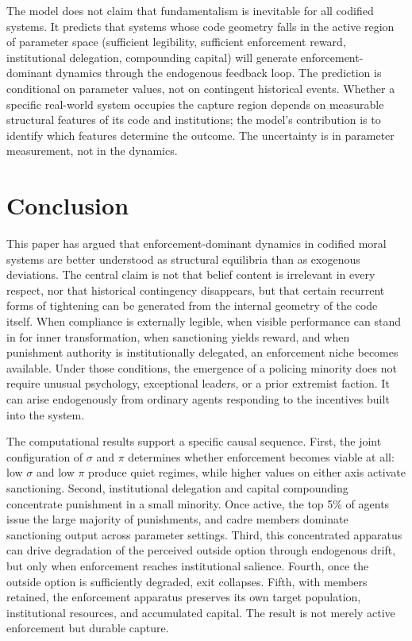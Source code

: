 \documentclass[12pt]{article}
\begin{document}
The model does not claim that fundamentalism is inevitable for all codified systems. It predicts that systems whose code geometry falls in the active region of parameter space (sufficient legibility, sufficient enforcement reward, institutional delegation, compounding capital) will generate enforcement-dominant dynamics through the endogenous feedback loop. The prediction is conditional on parameter values, not on contingent historical events. Whether a specific real-world system occupies the capture region depends on measurable structural features of its code and institutions; the model's contribution is to identify which features determine the outcome. The uncertainty is in parameter measurement, not in the dynamics.



\section{Conclusion}

This paper has argued that enforcement-dominant dynamics in codified moral systems are better understood as structural equilibria than as exogenous deviations. The central claim is not that belief content is irrelevant in every respect, nor that historical contingency disappears, but that certain recurrent forms of tightening can be generated from the internal geometry of the code itself. When compliance is externally legible, when visible performance can stand in for inner transformation, when sanctioning yields reward, and when punishment authority is institutionally delegated, an enforcement niche becomes available. Under those conditions, the emergence of a policing minority does not require unusual psychology, exceptional leaders, or a prior extremist faction. It can arise endogenously from ordinary agents responding to the incentives built into the system.

The computational results support a specific causal sequence. First, the joint configuration of $\sigma$ and $\pi$ determines whether enforcement becomes viable at all: low $\sigma$ and low $\pi$ produce quiet regimes, while higher values on either axis activate sanctioning. Second, institutional delegation and capital compounding concentrate punishment in a small minority. Once active, the top 5\% of agents issue the large majority of punishments, and cadre members dominate sanctioning output across parameter settings. Third, this concentrated apparatus can drive degradation of the perceived outside option through endogenous drift, but only when enforcement reaches institutional salience. Fourth, once the outside option is sufficiently degraded, exit collapses. Fifth, with members retained, the enforcement apparatus preserves its own target population, institutional resources, and accumulated capital. The result is not merely active enforcement but durable capture.
\end{document}
